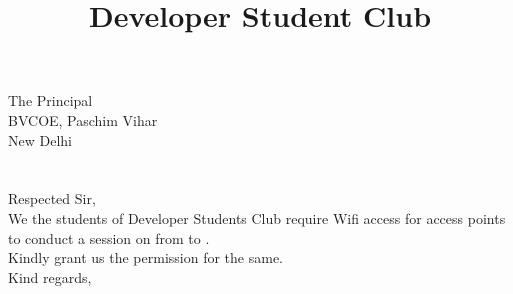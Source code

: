 \documentclass[12pt,a4paper]{article} %
\title{Developer Student Club}
\begin{document}
	
	
	\date{}
	\maketitle
	\hspace{-8mm}
	The Principal \\
	BVCOE, Paschim Vihar\\
	New Delhi\\
	\linebreak
	\\
	\linebreak
	\textbf{}\\
	\linebreak
	Respected Sir,\\
	
	\vspace{-5mm}
	\hspace{8mm}
	We the students of Developer Students Club require Wifi access for
	access points to conduct a session on 
	from 
	to 
	.\\
	Kindly grant us the permission for the same. \\
	\linebreak
	Kind regards,\\
	\\
	
\end{document}
